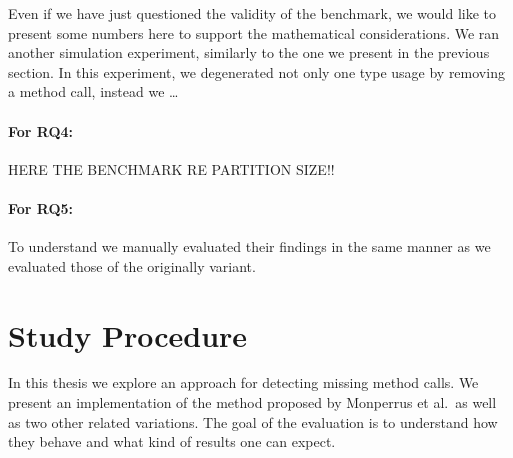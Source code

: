 Even if we have just questioned the validity of the benchmark, we would like to present some numbers here to support the mathematical considerations.
We ran another simulation experiment, similarly to the one we present in the previous section.
In this experiment, we degenerated not only one type usage by removing a method call, instead we  \ldots
{}


\paragraph{For RQ4:}

HERE THE BENCHMARK RE PARTITION SIZE!!

\paragraph{For RQ5:}

To understand  we manually evaluated their findings in the same manner as we evaluated those of the originally variant.

\section{Study Procedure}

In this thesis we explore an approach for detecting missing method calls.
We present an implementation of the method proposed by Monperrus et al.\ as well as two other related variations.
The goal of the evaluation is to understand how they behave and what kind of results one can expect.


